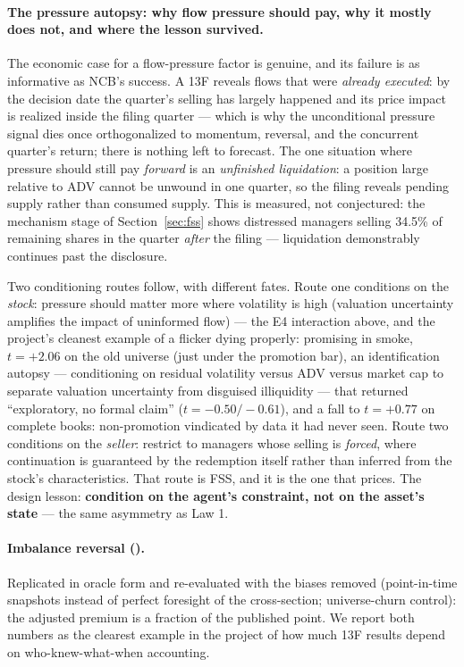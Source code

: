 \paragraph{The pressure autopsy: why flow pressure should pay, why
it mostly does not, and where the lesson survived.}
The economic case for a flow-pressure factor is genuine, and its
failure is as informative as NCB's success. A 13F reveals flows that
were \emph{already executed}: by the decision date the quarter's
selling has largely happened and its price impact is realized inside
the filing quarter --- which is why the unconditional pressure
signal dies once orthogonalized to momentum, reversal, and the
concurrent quarter's return; there is nothing left to forecast. The
one situation where pressure should still pay \emph{forward} is an
\emph{unfinished liquidation}: a position large relative to ADV
cannot be unwound in one quarter, so the filing reveals pending
supply rather than consumed supply. This is measured, not
conjectured: the mechanism stage of Section~\ref{sec:fss} shows
distressed managers selling 34.5\% of remaining shares in the
quarter \emph{after} the filing --- liquidation demonstrably
continues past the disclosure.

Two conditioning routes follow, with different fates. Route one
conditions on the \emph{stock}: pressure should matter more where
volatility is high (valuation uncertainty amplifies the impact of
uninformed flow) --- the E4 interaction above, and the project's
cleanest example of a flicker dying properly: promising in smoke,
$t=+2.06$ on the old universe (just under the promotion bar), an
identification autopsy --- conditioning on residual volatility
versus ADV versus market cap to separate valuation uncertainty from
disguised illiquidity --- that returned ``exploratory, no formal
claim'' ($t=-0.50/-0.61$), and a fall to $t=+0.77$ on complete
books: non-promotion vindicated by data it had never seen. Route two
conditions on the \emph{seller}: restrict to managers whose selling
is \emph{forced}, where continuation is guaranteed by the redemption
itself rather than inferred from the stock's characteristics. That
route is FSS, and it is the one that prices. The design lesson:
\textbf{condition on the agent's constraint, not on the asset's
state} --- the same asymmetry as Law 1.

\paragraph{Imbalance reversal (\citealt{miori2022}).}
Replicated in oracle form and re-evaluated with the biases removed
(point-in-time snapshots instead of perfect foresight of the
cross-section; universe-churn control): the adjusted premium is a
fraction of the published point. We report both numbers as the
clearest example in the project of how much 13F results depend on
who-knew-what-when accounting.

